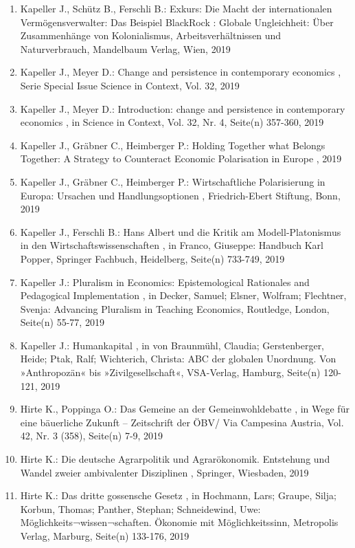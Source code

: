 \begin{enumerate}[leftmargin=*, labelsep=0.5cm]
	 \item Kapeller J., Schütz B., Ferschli B.:  Exkurs: Die Macht der internationalen Vermögensverwalter: Das Beispiel BlackRock  : Globale Ungleichheit: Über Zusammenhänge von Kolonialismus, Arbeitsverhältnissen und Naturverbrauch, Mandelbaum Verlag, Wien, 2019
	 \item Kapeller J., Meyer D.:  Change and persistence in contemporary economics  , Serie Special Issue Science in Context, Vol. 32, 2019
	 \item Kapeller J., Meyer D.:  Introduction: change and persistence in contemporary economics  , in Science in Context, Vol. 32, Nr. 4, Seite(n) 357-360, 2019
	 \item Kapeller J., Gräbner C., Heimberger P.:  Holding Together what Belongs Together: A Strategy to Counteract Economic Polarisation in Europe  , 2019
	 \item Kapeller J., Gräbner C., Heimberger P.:  Wirtschaftliche Polarisierung in Europa: Ursachen und Handlungsoptionen  , Friedrich-Ebert Stiftung, Bonn, 2019
	 \item Kapeller J., Ferschli B.:  Hans Albert und die Kritik am Modell-Platonismus in den Wirtschaftswissenschaften  , in Franco, Giuseppe: Handbuch Karl Popper, Springer Fachbuch, Heidelberg, Seite(n) 733-749, 2019
	 \item Kapeller J.:  Pluralism in Economics: Epistemological Rationales and Pedagogical Implementation  , in Decker, Samuel; Elsner, Wolfram; Flechtner, Svenja: Advancing Pluralism in Teaching Economics, Routledge, London, Seite(n) 55-77, 2019
	 \item Kapeller J.:  Humankapital  , in von Braunmühl, Claudia; Gerstenberger, Heide; Ptak, Ralf; Wichterich, Christa: ABC der globalen Unordnung. Von »Anthropozän« bis »Zivilgesellschaft«, VSA-Verlag, Hamburg, Seite(n) 120-121, 2019
	 \item Hirte K., Poppinga O.:  Das Gemeine an der Gemeinwohldebatte  , in Wege für eine bäuerliche Zukunft – Zeitschrift der ÖBV/ Via Campesina Austria, Vol. 42, Nr. 3 (358), Seite(n) 7-9, 2019
	 \item Hirte K.:  Die deutsche Agrarpolitik und Agrarökonomik. Entstehung und Wandel zweier ambivalenter Disziplinen  , Springer, Wiesbaden, 2019
	 \item Hirte K.:  Das dritte gossensche Gesetz  , in Hochmann, Lars; Graupe, Silja; Korbun, Thomas; Panther, Stephan; Schneidewind, Uwe: Möglichkeits¬wissen¬schaften. Ökonomie mit Möglichkeitssinn, Metropolis Verlag, Marburg, Seite(n) 133-176, 2019

\end{enumerate}

